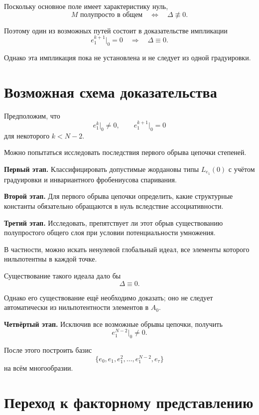 Поскольку основное поле имеет
характеристику нуль,
\[
\boxed{
	M\text{ полупросто в общем}
	\quad\Longleftrightarrow\quad
	\Delta\not\equiv0.
}
\]

Поэтому один из возможных путей состоит
в доказательстве импликации
\[
e_1^{k+1}\big|_0=0
\quad\Longrightarrow\quad
\Delta\equiv0.
\]

Однако эта импликация пока не установлена
и не следует из одной градуировки.

\section{Возможная схема доказательства}

Предположим, что
\[
e_1^k\big|_0\neq0,
\qquad
e_1^{k+1}\big|_0=0
\]
для некоторого $k<N-2$.

Можно попытаться исследовать последствия
первого обрыва цепочки степеней.

\medskip

\noindent
\textbf{Первый этап.}
Классифицировать допустимые жордановы
типы $L_{e_1}(0)$ с учётом градуировки
и инвариантного фробениусова спаривания.

\medskip

\noindent
\textbf{Второй этап.}
Для первого обрыва цепочки определить,
какие структурные константы обязательно
обращаются в нуль вследствие ассоциативности.

\medskip

\noindent
\textbf{Третий этап.}
Исследовать, препятствует ли этот обрыв
существованию полупростого общего слоя
при условии потенциальности умножения.

В частности, можно искать ненулевой
глобальный идеал, все элементы которого
нильпотентны в каждой точке.

Существование такого идеала дало бы
\[
\Delta\equiv0.
\]

Однако его существование ещё необходимо
доказать; оно не следует автоматически
из нильпотентности элементов в $A_0$.

\medskip

\noindent
\textbf{Четвёртый этап.}
Исключив все возможные обрывы цепочки,
получить
\[
e_1^{N-2}\big|_0\neq0.
\]

После этого построить базис
\[
\{e_0,e_1,e_1^2,\ldots,e_1^{N-2},e_\tau\}
\]
на всём многообразии.

\section{Переход к факторному представлению}

